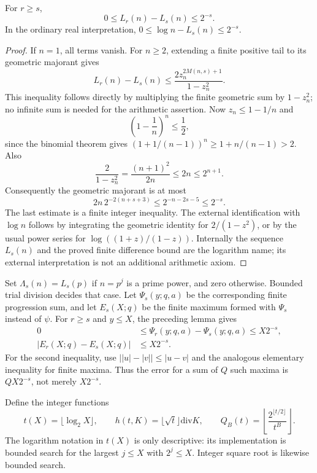 \begin{lemma}
For $r\geq s$,
\[
 0\leq L_r(n)-L_s(n)\leq2^{-s}.
\]
In the ordinary real interpretation,
$0\leq\log n-L_s(n)\leq2^{-s}$.
\end{lemma}
\begin{proof}
If $n=1$, all terms vanish. For $n\geq2$, extending a finite positive
tail to its geometric majorant gives
\[
 L_r(n)-L_s(n)
 \leq \frac{2z_n^{2M(n,s)+1}}{1-z_n^2}.
\]
This inequality follows directly by multiplying the finite geometric
sum by $1-z_n^2$; no infinite sum is needed for the arithmetic assertion.
Now $z_n\leq1-1/n$ and
\[
 \left(1-\frac1n\right)^n\leq\frac12,
\]
since the binomial theorem gives
$(1+1/(n-1))^n\geq1+n/(n-1)>2$.
Also
\[
 \frac{2}{1-z_n^2}=\frac{(n+1)^2}{2n}
 \leq2n\leq2^{n+1}.
\]
Consequently the geometric majorant is at most
\[
 2n\,2^{-2(n+s+3)}
 \leq2^{-n-2s-5}\leq2^{-s}.
\]
The last estimate is a finite integer inequality. The external
identification with $\log n$ follows by integrating the geometric
identity for $2/(1-z^2)$, or by the usual power series for
$\log((1+z)/(1-z))$. Internally the sequence $L_s(n)$ and the proved
finite difference bound are the logarithm name; its external
interpretation is not an additional arithmetic axiom.
\end{proof}

Set $\Lambda_s(n)=L_s(p)$ if $n=p^j$ is a prime power, and zero
otherwise. Bounded trial division decides that case. Let
$\Psi_s(y;q,a)$ be the corresponding finite progression sum, and let
$E_s(X;q)$ be the finite maximum formed with $\Psi_s$ instead of $\psi$.
For $r\geq s$ and $y\leq X$, the preceding lemma gives
\begin{align}
 0&\leq\Psi_r(y;q,a)-\Psi_s(y;q,a)\leq X2^{-s},
 \label{eq:psi-finite-error}\\
 |E_r(X;q)-E_s(X;q)|&\leq X2^{-s}.
 \label{eq:max-finite-error}
\end{align}
For the second inequality, use
$\bigl||u|-|v|\bigr|\leq|u-v|$ and the analogous elementary inequality
for finite maxima. Thus the error for a sum of $Q$ such maxima is
\emph{$QX2^{-s}$}, not merely $X2^{-s}$.

Define the integer functions
\[
 t(X)=\lfloor\log_2X\rfloor,\qquad
 h(t,K)=\lfloor\sqrt t\rfloor\mathbin{\mathrm{div}}K,
 \qquad
 Q_B(t)=\left\lfloor\frac{2^{\lfloor t/2\rfloor}}{t^B}\right\rfloor.
\]
The logarithm notation in $t(X)$ is only descriptive: its implementation
is bounded search for the largest $j\leq X$ with $2^j\leq X$.
Integer square root is likewise bounded search.

